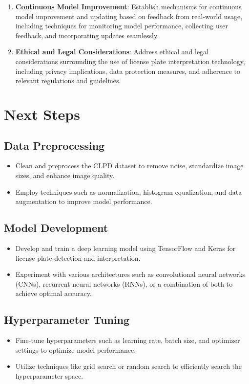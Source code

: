 \begin{enumerate}
		\item \textbf{Continuous Model Improvement}:
		Establish mechanisms for continuous model improvement and updating based on feedback from real-world usage, including techniques for monitoring model performance, collecting user feedback, and incorporating updates seamlessly.
		
		\item \textbf{Ethical and Legal Considerations}:
		Address ethical and legal considerations surrounding the use of license plate interpretation technology, including privacy implications, data protection measures, and adherence to relevant regulations and guidelines.
	\end{enumerate}
	
\section{Next Steps}



\subsection*{Data Preprocessing}
\begin{itemize}
	\item Clean and preprocess the CLPD dataset to remove noise, standardize image sizes, and enhance image quality.
	\item Employ techniques such as normalization, histogram equalization, and data augmentation to improve model performance.
\end{itemize}

\subsection*{Model Development}
\begin{itemize}
	\item Develop and train a deep learning model using TensorFlow and Keras for license plate detection and interpretation.
	\item Experiment with various architectures such as convolutional neural networks (CNNs), recurrent neural networks (RNNs), or a combination of both to achieve optimal accuracy.
\end{itemize}

\subsection*{Hyperparameter Tuning}
\begin{itemize}
	\item Fine-tune hyperparameters such as learning rate, batch size, and optimizer settings to optimize model performance.
	\item Utilize techniques like grid search or random search to efficiently search the hyperparameter space.
\end{itemize}

